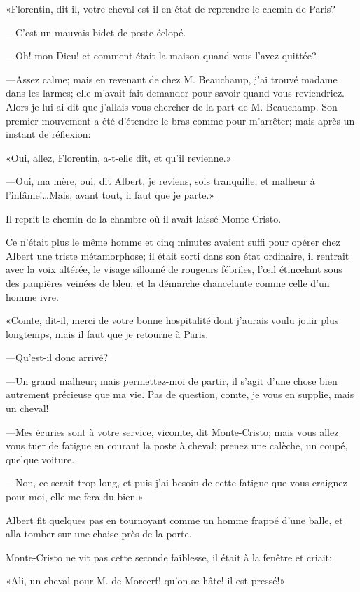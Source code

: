 «Florentin, dit-il, votre cheval est-il en état de reprendre le chemin de Paris? 

—C'est un mauvais bidet de poste éclopé. 

—Oh! mon Dieu! et comment était la maison quand vous l'avez quittée? 

—Assez calme; mais en revenant de chez M. Beauchamp, j'ai trouvé madame dans les larmes; elle m'avait fait demander pour savoir quand vous reviendriez. Alors je lui ai dit que j'allais vous chercher de la part de M. Beauchamp. Son premier mouvement a été d'étendre le bras comme pour m'arrêter; mais après un instant de réflexion: 

«Oui, allez, Florentin, a-t-elle dit, et qu'il revienne.» 

—Oui, ma mère, oui, dit Albert, je reviens, sois tranquille, et malheur à l'infâme!\dots Mais, avant tout, il faut que je parte.» 

Il reprit le chemin de la chambre où il avait laissé Monte-Cristo. 

Ce n'était plus le même homme et cinq minutes avaient suffi pour opérer chez Albert une triste métamorphose; il était sorti dans son état ordinaire, il rentrait avec la voix altérée, le visage sillonné de rougeurs fébriles, l'œil étincelant sous des paupières veinées de bleu, et la démarche chancelante comme celle d'un homme ivre. 

«Comte, dit-il, merci de votre bonne hospitalité dont j'aurais voulu jouir plus longtemps, mais il faut que je retourne à Paris. 

—Qu'est-il donc arrivé? 

—Un grand malheur; mais permettez-moi de partir, il s'agit d'une chose bien autrement précieuse que ma vie. Pas de question, comte, je vous en supplie, mais un cheval! 

—Mes écuries sont à votre service, vicomte, dit Monte-Cristo; mais vous allez vous tuer de fatigue en courant la poste à cheval; prenez une calèche, un coupé, quelque voiture. 

—Non, ce serait trop long, et puis j'ai besoin de cette fatigue que vous craignez pour moi, elle me fera du bien.» 

Albert fit quelques pas en tournoyant comme un homme frappé d'une balle, et alla tomber sur une chaise près de la porte. 

Monte-Cristo ne vit pas cette seconde faiblesse, il était à la fenêtre et criait: 

«Ali, un cheval pour M. de Morcerf! qu'on se hâte! il est pressé!» 

